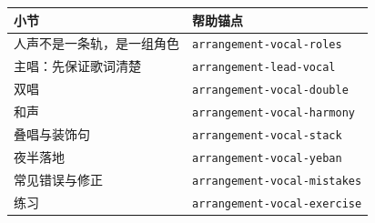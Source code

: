 \begin{helpmapping}
\begin{longtable}{p{}p{}}
\toprule
小节 & 帮助锚点 \\
\midrule
人声不是一条轨，是一组角色 & \texttt{arrangement-vocal-roles} \\
主唱：先保证歌词清楚 & \texttt{arrangement-lead-vocal} \\
双唱 & \texttt{arrangement-vocal-double} \\
和声 & \texttt{arrangement-vocal-harmony} \\
叠唱与装饰句 & \texttt{arrangement-vocal-stack} \\
夜半落地 & \texttt{arrangement-vocal-yeban} \\
常见错误与修正 & \texttt{arrangement-vocal-mistakes} \\
练习 & \texttt{arrangement-vocal-exercise} \\
\bottomrule
\end{longtable}
\end{helpmapping}
